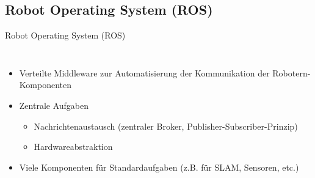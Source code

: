\documentclass[18pt]{beamer}
\begin{document}
\subsection{Robot Operating System (ROS)}
\begin{frame}{Robot Operating System (ROS)}
\begin{columns}
	\begin{itemize}
		\item Verteilte Middleware zur Automatisierung der Kommunikation der Robotern-Komponenten
		\item Zentrale Aufgaben
		\begin{itemize}
			\item Nachrichtenaustausch (zentraler Broker, Publisher-Subscriber-Prinzip)
			\item Hardwareabstraktion
		\end{itemize}
		\item Viele Komponenten für Standardaufgaben (z.B. für SLAM, Sensoren, etc.)
	\end{itemize}
		\vspace{10px}

\end{columns}
\end{frame}
\end{document}
